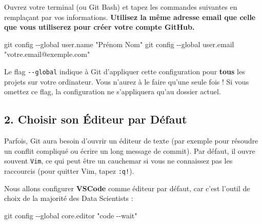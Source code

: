 \documentclass[
  letterpaper,
  DIV=11,
  numbers=noendperiod]{scrreprt}
\newenvironment{Shaded}{\begin{snugshade}}{\end{snugshade}}
\newcommand{\AttributeTok}[1]{\textcolor[rgb]{0.40,0.45,0.13}{#1}}
\newcommand{\FunctionTok}[1]{\textcolor[rgb]{0.28,0.35,0.67}{#1}}
\newcommand{\NormalTok}[1]{\textcolor[rgb]{0.00,0.23,0.31}{#1}}
\newcommand{\StringTok}[1]{\textcolor[rgb]{0.13,0.47,0.30}{#1}}
\begin{document}
Ouvrez votre terminal (ou Git Bash) et tapez les commandes suivantes en
remplaçant par vos informations. \textbf{Utilisez la même adresse email
que celle que vous utiliserez pour créer votre compte GitHub.}

\begin{Shaded}
\begin{Highlighting}[]
\FunctionTok{git}\NormalTok{ config }\AttributeTok{{-}{-}global}\NormalTok{ user.name }\StringTok{"Prénom Nom"}
\FunctionTok{git}\NormalTok{ config }\AttributeTok{{-}{-}global}\NormalTok{ user.email }\StringTok{"votre.email@exemple.com"}
\end{Highlighting}
\end{Shaded}

\begin{tcolorbox}[enhanced jigsaw, arc=.35mm, bottomrule=.15mm, bottomtitle=1mm, breakable, colback=white, colbacktitle=quarto-callout-tip-color!10!white, colframe=quarto-callout-tip-color-frame, coltitle=black, left=2mm, leftrule=.75mm, opacityback=0, opacitybacktitle=0.6, rightrule=.15mm, title=\textcolor{quarto-callout-tip-color}{\faLightbulb}\hspace{0.5em}{À quoi sert le \texttt{-\/-global} ?}, titlerule=0mm, toprule=.15mm, toptitle=1mm]

Le flag \texttt{-\/-global} indique à Git d'appliquer cette
configuration pour \textbf{tous} les projets sur votre ordinateur. Vous
n'aurez à le faire qu'une seule fois ! Si vous omettez ce flag, la
configuration ne s'appliquera qu'au dossier actuel.

\end{tcolorbox}

\subsection{2. Choisir son Éditeur par
Défaut}\label{choisir-son-uxe9diteur-par-duxe9faut}

Parfois, Git aura besoin d'ouvrir un éditeur de texte (par exemple pour
résoudre un conflit compliqué ou écrire un long message de commit). Par
défaut, il ouvre souvent \texttt{Vim}, ce qui peut être un cauchemar si
vous ne connaissez pas les raccourcis (pour quitter Vim, tapez
\texttt{:q!}).

Nous allons configurer \textbf{VSCode} comme éditeur par défaut, car
c'est l'outil de choix de la majorité des Data Scientists :

\begin{Shaded}
\begin{Highlighting}[]
\FunctionTok{git}\NormalTok{ config }\AttributeTok{{-}{-}global}\NormalTok{ core.editor }\StringTok{"code {-}{-}wait"}
\end{Highlighting}
\end{Shaded}
\end{document}
